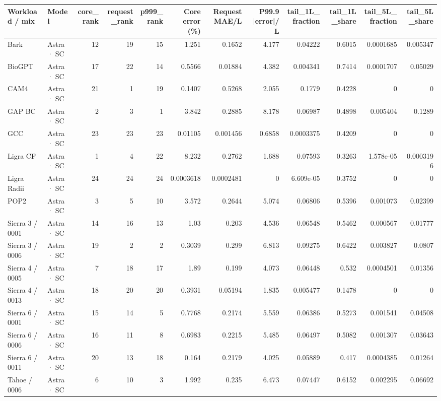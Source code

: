 \begin{tabular}{llrrrrrrrrrr}
\toprule
Workload / mix & Model & core\_rank & request\_rank & p999\_rank & Core error (\%) & Request MAE/L & P99.9 |error|/L & tail\_1L\_fraction & tail\_1L\_share & tail\_5L\_fraction & tail\_5L\_share \\
\midrule
Bark & Astra · SC & 12 & 19 & 15 & 1.251 & 0.1652 & 4.177 & 0.04222 & 0.6015 & 0.0001685 & 0.005347 \\
BioGPT & Astra · SC & 17 & 22 & 14 & 0.5566 & 0.01884 & 4.382 & 0.004341 & 0.7414 & 0.0001707 & 0.05029 \\
CAM4 & Astra · SC & 21 & 1 & 19 & 0.1407 & 0.5268 & 2.055 & 0.1779 & 0.4228 & 0 & 0 \\
GAP BC & Astra · SC & 2 & 3 & 1 & 3.842 & 0.2885 & 8.178 & 0.06987 & 0.4898 & 0.005404 & 0.1289 \\
GCC & Astra · SC & 23 & 23 & 23 & 0.01105 & 0.001456 & 0.6858 & 0.0003375 & 0.4209 & 0 & 0 \\
Ligra CF & Astra · SC & 1 & 4 & 22 & 8.232 & 0.2762 & 1.688 & 0.07593 & 0.3263 & 1.578e-05 & 0.0003196 \\
Ligra Radii & Astra · SC & 24 & 24 & 24 & 0.0003618 & 0.0002481 & 0 & 6.609e-05 & 0.3752 & 0 & 0 \\
POP2 & Astra · SC & 3 & 5 & 10 & 3.572 & 0.2644 & 5.074 & 0.06806 & 0.5396 & 0.001073 & 0.02399 \\
Sierra 3 / 0001 & Astra · SC & 14 & 16 & 13 & 1.03 & 0.203 & 4.536 & 0.06548 & 0.5462 & 0.000567 & 0.01777 \\
Sierra 3 / 0006 & Astra · SC & 19 & 2 & 2 & 0.3039 & 0.299 & 6.813 & 0.09275 & 0.6422 & 0.003827 & 0.0807 \\
Sierra 4 / 0005 & Astra · SC & 7 & 18 & 17 & 1.89 & 0.199 & 4.073 & 0.06448 & 0.532 & 0.0004501 & 0.01356 \\
Sierra 4 / 0013 & Astra · SC & 18 & 20 & 20 & 0.3931 & 0.05194 & 1.835 & 0.005477 & 0.1478 & 0 & 0 \\
Sierra 6 / 0001 & Astra · SC & 15 & 14 & 5 & 0.7768 & 0.2174 & 5.559 & 0.06386 & 0.5273 & 0.001541 & 0.04508 \\
Sierra 6 / 0006 & Astra · SC & 16 & 11 & 8 & 0.6983 & 0.2215 & 5.485 & 0.06497 & 0.5082 & 0.001307 & 0.03643 \\
Sierra 6 / 0011 & Astra · SC & 20 & 13 & 18 & 0.164 & 0.2179 & 4.025 & 0.05889 & 0.417 & 0.0004385 & 0.01264 \\
Tahoe / 0006 & Astra · SC & 6 & 10 & 3 & 1.992 & 0.235 & 6.473 & 0.07447 & 0.6152 & 0.002295 & 0.06692 \\

\end{tabular}
